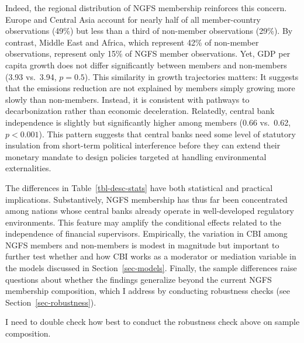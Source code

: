 \documentclass[
  12pt,
  letterpaper,
]{article}
\begin{document}
Indeed, the regional distribution of NGFS membership reinforces this
concern. Europe and Central Asia account for nearly half of all
member-country observations (49\%) but less than a third of non-member
observations (29\%). By contrast, Middle East and Africa, which
represent 42\% of non-member observations, represent only 15\% of NGFS
member observations. Yet, GDP per capita growth does not differ
significantly between members and non-members (3.93 vs.~3.94,
\(p = 0.5\)). This similarity in growth trajectories matters: It
suggests that the emissions reduction are not explained by members
simply growing more slowly than non-members. Instead, it is consistent
with pathways to decarbonization rather than economic deceleration.
Relatedly, central bank independence is slightly but significantly
higher among members (0.66 vs.~0.62, \(p < 0.001\)). This pattern
suggests that central banks need some level of statutory insulation from
short-term political interference before they can extend their monetary
mandate to design policies targeted at handling environmental
externalities.

The differences in Table~\ref{tbl-desc-stats} have both statistical and
practical implications. Substantively, NGFS membership has thus far been
concentrated among nations whose central banks already operate in
well-developed regulatory environments. This feature may amplify the
conditional effects related to the independence of financial
supervisors. Empirically, the variation in CBI among NGFS members and
non-members is modest in magnitude but important to further test whether
and how CBI works as a moderator or mediation variable in the models
discussed in Section~\ref{sec-models}. Finally, the sample differences
raise questions about whether the findings generalize beyond the current
NGFS membership composition, which I address by conducting robustness
checks (see Section~\ref{sec-robustness}).

\begin{tcolorbox}[enhanced jigsaw, arc=.35mm, bottomrule=.15mm, bottomtitle=1mm, breakable, colback=white, colbacktitle=quarto-callout-note-color!10!white, colframe=quarto-callout-note-color-frame, coltitle=black, left=2mm, leftrule=.75mm, opacityback=0, opacitybacktitle=0.6, rightrule=.15mm, title=\textcolor{quarto-callout-note-color}{\faInfo}\hspace{0.5em}{Note}, titlerule=0mm, toprule=.15mm, toptitle=1mm]

I need to double check how best to conduct the robustness check above on
sample composition.

\end{tcolorbox}
\end{document}
